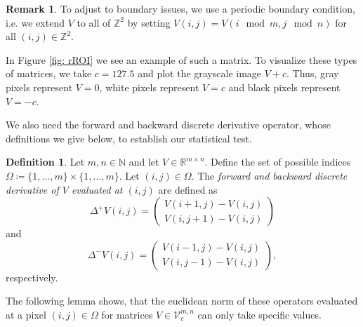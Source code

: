 \documentclass[a4paper,12pt]{article}
\theoremstyle{plain}
\theoremstyle{definition}
\newtheorem{definition}[theorem]{Definition}
\newtheorem{remark}[theorem]{Remark}
\begin{document}
\begin{remark}
	To adjust to boundary issues, we use a periodic boundary condition, i.e. we extend $V$ to all of $\mathbb{Z}^2$ by setting $V(i, j) = V(i \mod m, j \mod n)$ for all $(i, j) \in \mathbb{Z}^2$.
\end{remark}

In Figure \ref{fig: rROI} we see an example of such a matrix. To visualize these types of matrices, we take $c = 127.5$ and plot the grayscale image $V + c$. Thus, gray pixels represent $V = 0$, white pixels represent $V = c$ and black pixels represent $V = - c$.

We also need the forward and backward discrete derivative operator, whose definitions we give below, to establish our statistical test.

\begin{definition}
	Let $m, n \in \mathbb{N}$ and let $V \in \mathbb{R}^{m \times n}$. Define the set of possible indices $\Omega \coloneqq \{ 1, \dots, m \} \times \{ 1, \dots, m \}$. Let $(i, j) \in \Omega$. The \textit{forward and backward discrete derivative of $V$ evaluated at $(i, j)$} are defined as
	\begin{equation}
		\Delta^+ V(i, j) =
		\begin{pmatrix}
			V(i + 1, j) - V(i, j) \\
			V(i, j + 1) - V(i, j)
		\end{pmatrix}
	\end{equation}
	and
	\begin{equation}
		\Delta^- V(i, j) =
		\begin{pmatrix}
			V(i - 1, j) - V(i, j) \\
			V(i, j - 1) - V(i, j)
		\end{pmatrix}
		,
	\end{equation}
	respectively.
\end{definition}

The following lemma shows, that the euclidean norm of these operators evaluated at a pixel $(i, j) \in \Omega$ for matrices $V \in \mathcal{V}_c^{m, n}$ can only take specific values.
\end{document}
